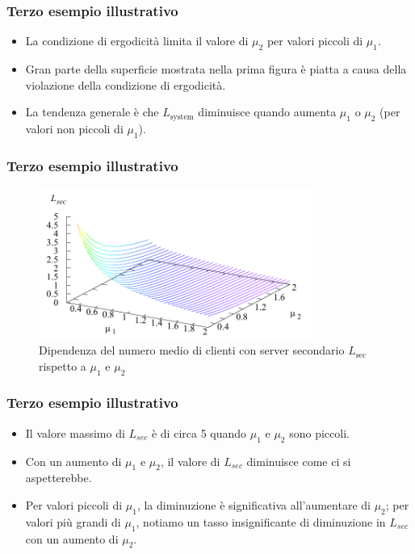 \documentclass{beamer}
\begin{document}
\begin{frame}
    \frametitle{Terzo esempio illustrativo}
    \begin{itemize}
        \item La condizione di ergodicità limita il valore di $\mu_2$ per valori piccoli di $\mu_1$.
        \item Gran parte della superficie mostrata nella prima figura è piatta a causa della violazione della condizione di ergodicità.
        \item La tendenza generale è che $L_{\text{system}}$ diminuisce quando aumenta $\mu_1$ o $\mu_2$ (per valori non piccoli di $\mu_1$).
    \end{itemize}
\end{frame}


\begin{frame}
    \frametitle{Terzo esempio illustrativo}
    \begin{figure}[h]
        \centering
        \includegraphics[width=0.8\textwidth]{R1VGHAR.png}
        \caption{Dipendenza del numero medio di clienti con server secondario $L_{\mathrm{sec}}$ rispetto a $\mu_1$ e $\mu_2$}
    \end{figure}
\end{frame}


\begin{frame}
    \frametitle{Terzo esempio illustrativo}

    \begin{itemize}
        \item Il valore massimo di $L_{sec}$ è di circa 5 quando $\mu_1$ e $\mu_2$ sono piccoli.
        \item Con un aumento di $\mu_1$ e $\mu_2$, il valore di $L_{sec}$ diminuisce come ci si aspetterebbe.
        \item Per valori piccoli di $\mu_1$, la diminuzione è significativa all'aumentare di $\mu_2$; per valori più grandi di $\mu_1$, notiamo un tasso insignificante di diminuzione in $L_{sec}$ con un aumento di $\mu_2$.
    \end{itemize}


\end{frame}
\end{document}
